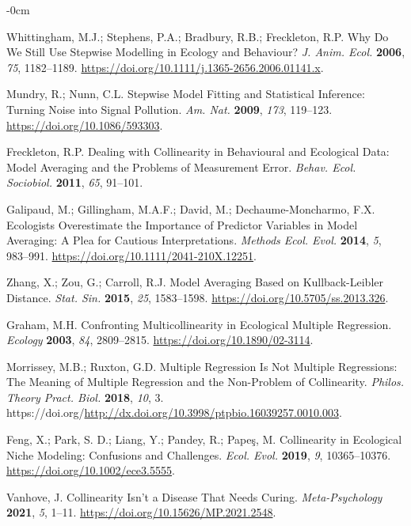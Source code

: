 \documentclass[entropy,article,accept,pdftex,moreauthors]{Definitions/mdpi}
\begin{document}
\begin{adjustwidth}{-\extralength}{0cm}
\begin{thebibliography}{999}
Whittingham, M.J.;  Stephens, P.A.;  Bradbury, R.B.;  Freckleton, R.P.  Why Do We Still Use Stepwise Modelling in
Ecology and Behaviour? \emph{J. Anim. Ecol.} \textbf{2006}, \emph{75}, 
1182--1189. \url{https://doi.org/10.1111/j.1365-2656.2006.01141.x}.

Mundry, R.; Nunn, C.L.  Stepwise {Model Fitting}
and {Statistical Inference}: {Turning Noise} into {Signal Pollution}. 
\emph{ Am. Nat.} \textbf{2009}, \emph{173}, 119--123.
\url{https://doi.org/10.1086/593303}.

Freckleton, R.P. Dealing with Collinearity in Behavioural
and Ecological Data: Model Averaging and the Problems of Measurement
Error.  \emph{Behav. Ecol. Sociobiol.} \textbf{2011}, \emph{65},  91--101.

Galipaud, M.; Gillingham, M.A.F.; David, M.; Dechaume-Moncharmo, F.X. Ecologists Overestimate
the Importance of Predictor Variables in Model Averaging: A Plea for
Cautious Interpretations.  \emph{Methods Ecol. Evol.} \textbf{2014}, \emph{5}, 983--991. \url{https://doi.org/10.1111/2041-210X.12251}.

Zhang, X.;  Zou, G.;  Carroll, R.J. Model
Averaging Based on {Kullback}-{Leibler} Distance.  \emph{Stat.
Sin.} \textbf{2015},  \emph{25}, 1583--1598. \url{https://doi.org/10.5705/ss.2013.326}.

Graham, M.H.  Confronting {Multicollinearity} in
{Ecological Multiple Regression}.  \emph{Ecology} \textbf{2003}, \emph{84},  2809--2815.
\url{https://doi.org/10.1890/02-3114}.

Morrissey, M.B.; Ruxton, G.D.  Multiple
{Regression Is Not Multiple Regressions}: {The Meaning} of {Multiple
Regression} and the {Non-Problem} of {Collinearity}. 
\emph{Philos. Theory Pract. Biol.} \textbf{2018}, \emph{10}, 3.
https://doi.org/\url{http://dx.doi.org/10.3998/ptpbio.16039257.0010.003}.

Feng, X.; Park, S. D.; Liang, Y.; Pandey, R.; Papeş, M. Collinearity in Ecological Niche Modeling: {Confusions} and
Challenges.  \emph{Ecol. Evol.} \textbf{2019},  \emph{9}, 10365--10376.
\url{https://doi.org/10.1002/ece3.5555}.

Vanhove, J. Collinearity Isn't a Disease That Needs
Curing.  \emph{Meta-Psychology} \textbf{2021}, \emph{5}, 1--11.
\url{https://doi.org/10.15626/MP.2021.2548}.


\end{thebibliography}
\end{adjustwidth}
\end{document}
